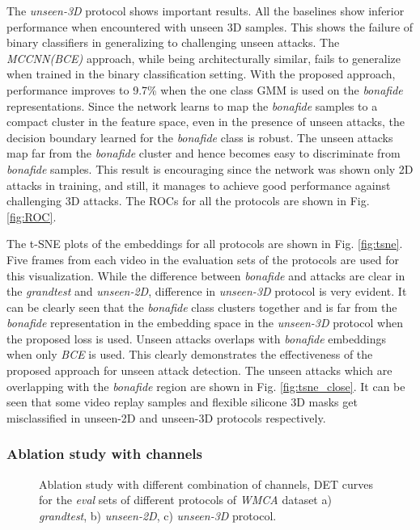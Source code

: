 \documentclass[journal]{IEEEtran}
\begin{document}
The \textit{unseen-3D} protocol shows important results. All the baselines show inferior performance when encountered with unseen 3D samples. This shows the failure of binary classifiers in generalizing to challenging unseen attacks. The \textit{MCCNN(BCE)} approach, while being architecturally similar, fails to generalize when trained in the binary classification setting. With the proposed approach, performance improves to 9.7\% when the one class GMM is used on the \textit{bonafide} representations. Since the network learns to map the \textit{bonafide} samples to a compact cluster in the feature space, even in the presence of unseen attacks, the decision boundary learned for the \textit{bonafide} class is robust. The unseen attacks map far from the \textit{bonafide} cluster and hence becomes easy to discriminate from \textit{bonafide} samples. This result is encouraging since the network was shown only 2D attacks in training, and still, it manages to achieve good performance against challenging 3D attacks. The ROCs for all the protocols are shown in Fig. \ref{fig:ROC}.

The t-SNE \cite{maaten2008visualizing} plots of the embeddings for all protocols are shown in Fig. \ref{fig:tsne}. Five frames from each video in the evaluation sets of the protocols are used for this visualization. While the difference between \textit{bonafide} and attacks are clear in the \textit{grandtest} and \textit{unseen-2D}, difference in \textit{unseen-3D} protocol is very evident. It can be clearly seen that the \textit{bonafide} class clusters together and is far from the \textit{bonafide} representation in the embedding space in the \textit{unseen-3D} protocol when the proposed loss is used. Unseen attacks overlaps with \textit{bonafide} embeddings when only \textit{BCE} is used. This clearly demonstrates the effectiveness of the proposed approach for unseen attack detection. The unseen attacks which are overlapping with the \textit{bonafide} region are shown in Fig. \ref{fig:tsne_close}. It can be seen that some video replay samples and flexible silicone 3D masks get misclassified in unseen-2D and unseen-3D protocols respectively.

\subsubsection{Ablation study with channels}

\begin{figure*}[ht!]
\centering
  \hfil
  \hfil
  \caption{Ablation study with different combination of channels, DET curves for the \textit{eval} sets of different protocols of \textit{WMCA} dataset a) \textit{grandtest}, b) \textit{unseen-2D}, c) \textit{unseen-3D} protocol.}
 \label{fig:ablation_ROC}
\end{figure*}
\end{document}
